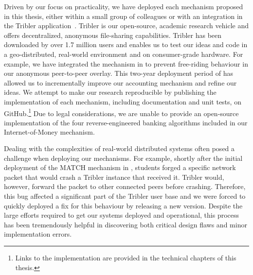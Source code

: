 Driven by our focus on practicality, we have deployed each mechanism proposed in this thesis, either within a small group of colleagues or with an integration in the Tribler application~\cite{zeilemaker2011tribler}.
Tribler is our open-source, academic research vehicle and offers decentralized, anonymous file-sharing capabilities.
Tribler has been downloaded by over 1.7 million users and enables us to test our ideas and code in a geo-distributed, real-world environment and on consumer-grade hardware.
For example, we have integrated the \TrustChain{} mechanism in \Tribler{} to prevent free-riding behaviour in our anonymous peer-to-peer overlay.
This two-year deployment period of \TrustChain{} has allowed us to incrementally improve our accounting mechanism and refine our ideas.
We attempt to make our research reproducible by publishing the implementation of each mechanism, including documentation and unit tests, on GitHub.\footnote{Links to the implementation are provided in the technical chapters of this thesis.}
Due to legal considerations, we are unable to provide an open-source implementation of the four reverse-engineered banking algorithms included in our Internet-of-Money mechanism.

Dealing with the complexities of real-world distributed systems often posed a challenge when deploying our mechanisms.
For example, shortly after the initial deployment of the MATCH mechanism in \Tribler{}, students forged a specific network packet that would crash a Tribler instance that received it.
Tribler would, however, forward the packet to other connected peers before crashing.
Therefore, this bug affected a significant part of the Tribler user base and we were forced to quickly deployed a fix for this behaviour by releasing a new version.
Despite the large efforts required to get our systems deployed and operational, this process has been tremendously helpful in discovering both critical design flaws and minor implementation errors.



